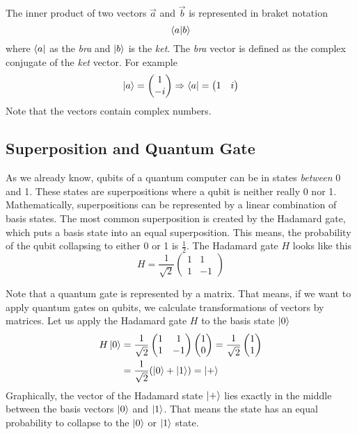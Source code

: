 The inner product of two vectors $\vec a$ and $\vec b$ is represented in braket notation
\begin{equation}
    \braket{a | b}
\end{equation}
where $\bra a$ as the \textit{bra} and $\ket b$ is the \textit{ket}.
The \textit{bra} vector is defined as the complex conjugate of the \textit{ket} vector. 
For example
\begin{equation}
  \ket a=  \begin{pmatrix}1\\-i\end{pmatrix}  \Rightarrow \bra a = \begin{pmatrix}1 & i\end{pmatrix}
\end{equation}
Note that the vectors contain complex numbers.

\subsection{Superposition and Quantum Gate}
As we already know, qubits of a quantum computer can be in states \textit{between} 0 and 1. 
These states are superpositions where a qubit is neither really 0 nor 1.
Mathematically, superpositions can be represented by a linear combination of basis states. 
The most common superposition is created by the Hadamard gate, which puts a basis state into an equal superposition. 
This means, the probability of the qubit collapsing to either 0 or 1 is $\frac 1 2$.
The Hadamard gate $H$ looks like this
\begin{equation}
    H = \frac{1}{\sqrt{2}} \begin{pmatrix}1 & 1\\ 1 & -1\end{pmatrix}  
\end{equation}

Note that a quantum gate is represented by a matrix.
That means, if we want to apply quantum gates on qubits, we calculate transformations of vectors by matrices. 
Let us apply the Hadamard gate $H$ to the basis state $\ket 0$
\begin{equation}
   \begin{split}
   H \ket 0 &=  \frac{1}{\sqrt{2}} \begin{pmatrix}1 & 1\\ 1 & -1\end{pmatrix} \begin{pmatrix}1\\0\end{pmatrix}   
    =  \frac{1}{\sqrt{2}} \begin{pmatrix}1\\1\end{pmatrix}   \\
    &=  \frac{1}{\sqrt{2}} (\ket 0 + \ket 1)  = \ket +
   \end{split}
\end{equation}
Graphically, the vector of the Hadamard state $\ket +$ lies exactly in the middle between the basis vectors $\ket 0$ and $\ket 1$.
That means the state has an equal probability to collapse to the $\ket 0$ or $\ket 1$ state.


